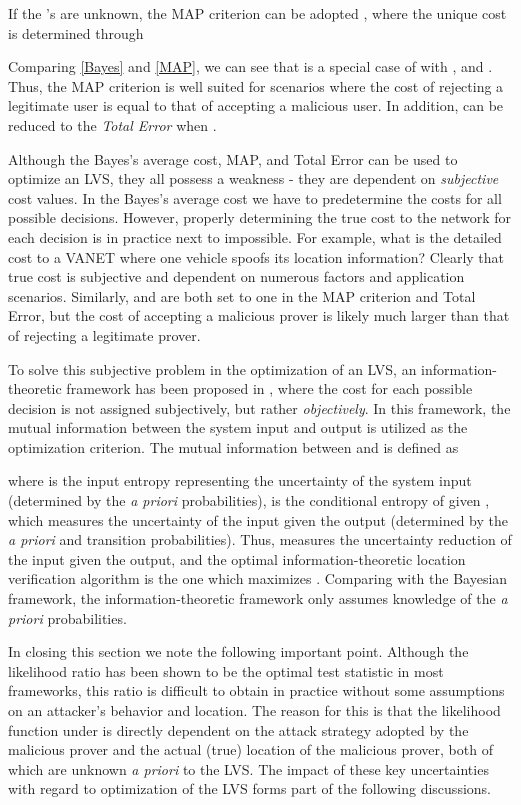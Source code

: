 \documentclass[journal]{IEEEtran}
\begin{document}
If the 's are unknown, the MAP criterion can be adopted \cite{barkat2005signal}, where the unique cost is determined through

Comparing \eqref{Bayes} and \eqref{MAP}, we can see that  is a special case of  with , and . Thus, the MAP criterion is well suited for scenarios where the cost of rejecting a legitimate user is equal to that of accepting a malicious user. In addition,  can be reduced to the \emph{Total Error} when  \cite{chen2010detecting}.


Although the Bayes's average cost, MAP,  and Total Error can be used to optimize an LVS, they all possess a weakness - they are dependent on \emph{subjective} cost values. In the Bayes's average cost we have to predetermine the costs for all possible decisions. However, properly determining the true cost to the network for each decision is in practice next to impossible. For example, what is the detailed cost to a VANET where one vehicle spoofs its location information? Clearly that true cost is subjective and dependent on numerous factors and application scenarios.
Similarly,  and  are both set to one in the MAP criterion and Total Error, but the cost of accepting a malicious prover is likely much larger than that of rejecting a legitimate prover.

To solve this subjective problem in the optimization of an LVS, an information-theoretic framework has been proposed in \cite{yan2012information,yan2012optimal}, where the cost for each possible decision is not assigned subjectively, but rather \emph{objectively}.
In this framework, the mutual information between the system input and output is utilized as the optimization criterion. The mutual information between  and  is defined as

where  is the input entropy representing the uncertainty of the system input (determined by the \emph{a priori} probabilities),  is the conditional entropy of  given , which measures the uncertainty of the input given the output (determined by the \emph{a priori} and transition probabilities). Thus,  measures the uncertainty reduction of the input given the output, and the optimal information-theoretic location verification algorithm is the one which maximizes . Comparing with the Bayesian framework, the information-theoretic framework only assumes knowledge of the \emph{a priori} probabilities.



In closing this section we note the following important point. Although the likelihood ratio has been shown to be the optimal test statistic in most frameworks, this ratio is difficult to obtain in practice without some assumptions on an attacker's behavior and location. The reason for this is that the likelihood function under  is directly dependent on the attack strategy adopted by the malicious prover and the actual (true) location of the malicious prover, both of which are unknown \emph{a priori} to the LVS. The impact of these key uncertainties with regard to optimization of the LVS forms part of the following discussions.
\end{document}
